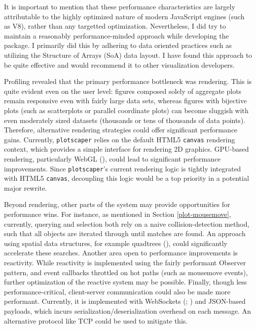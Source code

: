 \documentclass[
  openany]{book}
\theoremstyle{definition}
\theoremstyle{definition}
\theoremstyle{definition}
\theoremstyle{definition}
\theoremstyle{remark}
\begin{document}
It is important to mention that these performance characteristics are largely attributable to the highly optimized nature of modern JavaScript engines (such as V8), rather than any targetted optimization. Nevertheless, I did try to maintain a reasonably performance-minded approach while developing the package. I primarily did this by adhering to data oriented practices such as utilizing the Structure of Arrays (SoA) data layout. I have found this approach to be quite effective and would recommend it to other visualization developers.

Profiling revealed that the primary performance bottleneck was rendering. This is quite evident even on the user level: figures composed solely of aggregate plots remain responsive even with fairly large data sets, whereas figures with bijective plots (such as scatterplots or parallel coordinate plots) can become sluggish with even moderately sized datasets (thousands or tens of thousands of data points). Therefore, alternative rendering strategies could offer significant performance gains. Currently, \texttt{plotscaper} relies on the default HTML5 \texttt{canvas} rendering context, which provides a simple interface for rendering 2D graphics. GPU-based rendering, particularly WebGL (), could lead to significant performance improvements. Since \texttt{plotscaper}'s current rendering logic is tightly integrated with HTML5 \texttt{canvas}, decoupling this logic would be a top priority in a potential major rewrite.

Beyond rendering, other parts of the system may provide opportunities for performance wins. For instance, as mentioned in Section \ref{plot-mousemove}, currently, querying and selection both rely on a naive collision-detection method, such that all objects are iterated through until matches are found. An approach using spatial data structures, for example quadtrees (), could significantly accelerate these searches. Another area open to performance improvements is reactivity. While reactivity is implemented using the fairly performant Observer pattern, and event callbacks throttled on hot paths (such as mousemove events), further optimization of the reactive system may be possible. Finally, though less performance-critical, client-server communication could also be made more performant. Currently, it is implemented with WebSockets (; ) and JSON-based payloads, which incurs serialization/deserialization overhead on each message. An alternative protocol like TCP could be used to mitigate this.
\end{document}
